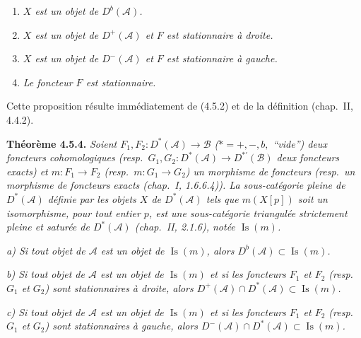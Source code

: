 \clearpage
{}%
\begingroup\small\setlength{\parskip}{0pt}\setlength{\emergencystretch}{1.5em}
\setlength{\abovedisplayskip}{4pt plus 2pt minus 2pt}%
\setlength{\belowdisplayskip}{4pt plus 2pt minus 2pt}%

\begin{enumerate}
\item[1)] \textit{$X$ est un objet de $D^b(\mathcal A)$.}
\item[2)] \textit{$X$ est un objet de $D^+(\mathcal A)$ et $F$ est
stationnaire à droite.}
\item[3)] \textit{$X$ est un objet de $D^-(\mathcal A)$ et $F$ est
stationnaire à gauche.}
\item[4)] \textit{Le foncteur $F$ est stationnaire.}
\end{enumerate}

Cette proposition résulte immédiatement de (4.5.2) et de la définition
(chap.~II, 4.4.2).

\medskip\noindent\textbf{Théorème 4.5.4.}\quad
\textit{Soient
$F_1,F_2\colon D^*(\mathcal A)\longrightarrow\mathcal B$
($*=+,-,b,{}$ ``vide'') deux foncteurs cohomologiques (resp.\
$G_1,G_2\colon D^*(\mathcal A)\longrightarrow D^{*'}(\mathcal B)$ deux
foncteurs exacts) et $m\colon F_1\longrightarrow F_2$ (resp.\
$m\colon G_1\longrightarrow G_2$) un morphisme de foncteurs (resp.\ un
morphisme de foncteurs exacts (chap.~I, 1.6.6.4)). La sous-catégorie pleine
de $D^*(\mathcal A)$ définie par les objets $X$ de $D^*(\mathcal A)$ tels
que $m(X[p])$ soit un isomorphisme, pour tout entier $p$, est une
sous-catégorie triangulée strictement pleine et saturée de
$D^*(\mathcal A)$ (chap.~II, 2.1.6), notée $\operatorname{Is}(m)$.}

\VerdierSemanticAnchor{ch4d-4-5-4-a}
\noindent\textit{a) Si tout objet de $\mathcal A$ est un objet de
$\operatorname{Is}(m)$, alors
$D^b(\mathcal A)\subset\operatorname{Is}(m)$.}

\noindent\textit{b) Si tout objet de $\mathcal A$ est un objet de
$\operatorname{Is}(m)$ et si les foncteurs $F_1$ et $F_2$ (resp. $G_1$ et
$G_2$) sont stationnaires à droite, alors
$D^+(\mathcal A)\cap D^*(\mathcal A)\subset\operatorname{Is}(m)$.}

\VerdierSemanticAnchor{ch4d-4-5-4-c}
\noindent\textit{c) Si tout objet de $\mathcal A$ est un objet de
$\operatorname{Is}(m)$ et si les foncteurs $F_1$ et $F_2$ (resp. $G_1$ et
$G_2$) sont stationnaires à gauche, alors
$D^-(\mathcal A)\cap D^*(\mathcal A)\subset\operatorname{Is}(m)$.}

